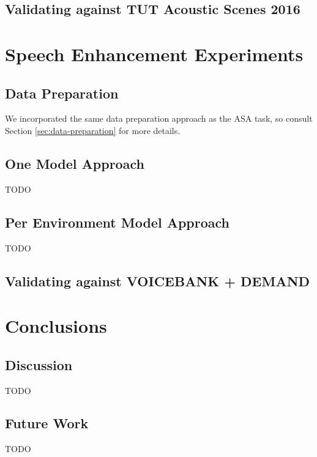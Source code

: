 \documentclass[logo,bsc,singlespacing,parskip,online]{infthesis}
\begin{document}
\section{Validating against TUT Acoustic Scenes 2016}

\chapter{Speech Enhancement Experiments}
\section{Data Preparation}
We incorporated the same data preparation approach as the ASA task, so consult Section \ref{sec:data-preparation} for more details.
\section{One Model Approach}
TODO
\section{Per Environment Model Approach}
TODO
\section{Validating against VOICEBANK + DEMAND}

\chapter{Conclusions}
\section{Discussion}
TODO
\section{Future Work}
TODO










\end{document}
